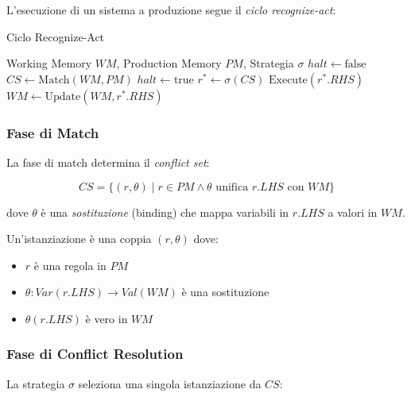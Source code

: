 L'esecuzione di un sistema a produzione segue il \textit{ciclo recognize-act}:

\begin{algorithm}[H]
\caption{Ciclo Recognize-Act}
\label{alg:recognize_act}
\begin{algorithmic}[1]
\Require Working Memory $WM$, Production Memory $PM$, Strategia $\sigma$
\State $halt \gets \text{false}$
    \State $CS \gets \text{Match}(WM, PM)$ 
        \State $halt \gets \text{true}$ 
    \Else
        \State $r^* \gets \sigma(CS)$ 
        \State $\text{Execute}(r^*.RHS)$ 
        \State $WM \gets \text{Update}(WM, r^*.RHS)$ 
    \EndIf
\EndWhile
\end{algorithmic}
\end{algorithm}

\subsubsection{Fase di Match}

La fase di match determina il \textit{conflict set}:

\begin{equation}
CS = \{(r, \theta) \mid r \in PM \land \theta \text{ unifica } r.LHS \text{ con } WM\}
\end{equation}

dove $\theta$ è una \textit{sostituzione} (binding) che mappa variabili in $r.LHS$ a valori in $WM$.

\begin{definizione}[Istanziazione]
Un'istanziazione è una coppia $(r, \theta)$ dove:
\begin{itemize}
\item $r$ è una regola in $PM$
\item $\theta: Var(r.LHS) \to Val(WM)$ è una sostituzione
\item $\theta(r.LHS)$ è vero in $WM$
\end{itemize}
\end{definizione}

\subsubsection{Fase di Conflict Resolution}

La strategia $\sigma$ seleziona una singola istanziazione da $CS$:

